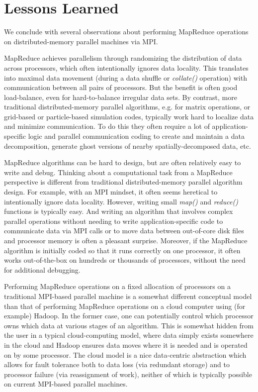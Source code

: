 \section{Lessons Learned}
\label{sec:lessons}

We conclude with several observations about performing MapReduce
operations on distributed-memory parallel machines via MPI.

MapReduce achieves parallelism through randomizing the distribution of
data across processors, which often intentionally ignores data
locality.  This translates into maximal data movement (during a data
shuffle or {\it collate()} operation) with communication between all
pairs of processors.  But the benefit is often good load-balance, even
for hard-to-balance irregular data sets.  By contrast, more
traditional distributed-memory parallel algorithms, e.g. for matrix
operations, or grid-based or particle-based simulation codes,
typically work hard to localize data and minimize communication.  To
do this they often require a lot of application-specific logic and
parallel communication coding to create and maintain a data
decomposition, generate ghost versions of nearby spatially-decomposed
data, etc.

MapReduce algorithms can be hard to design, but are often relatively
easy to write and debug.  Thinking about a computational task from a
MapReduce perspective is different from traditional distributed-memory
parallel algorithm design.  For example, with an MPI mindset, it often
seems heretical to intentionally ignore data locality.  However,
writing small {\it map()} and {\it reduce()} functions is typically
easy.  And writing an algorithm that involves complex parallel
operations without needing to write application-specific code to
communicate data via MPI calls or to move data between out-of-core
disk files and processor memory is often a pleasant surprise.
Moreover, if the MapReduce algorithm is initially coded so that it
runs correctly on one processor, it often works out-of-the-box on
hundreds or thousands of processors, without the need for additional
debugging.

Performing MapReduce operations on a fixed allocation of processors on
a traditional MPI-based parallel machine is a somewhat different
conceptual model than that of performing MapReduce operations on a
cloud computer using (for example) Hadoop.  In the former case, one
can potentially control which processor owns which data at various
stages of an algorithm.  This is somewhat hidden from the user in a
typical cloud-computing model, where data simply exists somewhere in
the cloud and Hadoop ensures data moves where it is needed and is
operated on by some processor.  The cloud model is a nice data-centric
abstraction which allows for fault tolerance both to data loss (via
redundant storage) and to processor failure (via reassignment of
work), neither of which is typically possible on current MPI-based
parallel machines.

